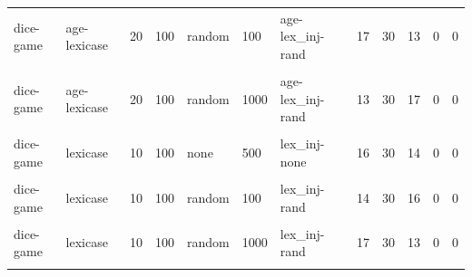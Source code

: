 \documentclass[
]{book}
\begin{document}
\begin{table}
\begin{tabular}{l|l|l|l|l|l|l|r|r|r|r|r}
\hline
\cellcolor{gray!6}{dice-game} & \cellcolor{gray!6}{age-lexicase} & \cellcolor{gray!6}{10} & \cellcolor{gray!6}{100} & \cellcolor{gray!6}{random} & \cellcolor{gray!6}{1000} & \cellcolor{gray!6}{age-lex\_inj-rand} & \cellcolor{gray!6}{15} & \cellcolor{gray!6}{30} & \cellcolor{gray!6}{15} & \cellcolor{gray!6}{9} & \cellcolor{gray!6}{4}\\
\hline
dice-game & age-lexicase & 20 & 100 & random & 100 & age-lex\_inj-rand & 17 & 30 & 13 & 0 & 0\\
\hline
\cellcolor{gray!6}{dice-game} & \cellcolor{gray!6}{age-lexicase} & \cellcolor{gray!6}{20} & \cellcolor{gray!6}{100} & \cellcolor{gray!6}{random} & \cellcolor{gray!6}{500} & \cellcolor{gray!6}{age-lex\_inj-rand} & \cellcolor{gray!6}{13} & \cellcolor{gray!6}{30} & \cellcolor{gray!6}{17} & \cellcolor{gray!6}{1} & \cellcolor{gray!6}{0}\\
\hline
dice-game & age-lexicase & 20 & 100 & random & 1000 & age-lex\_inj-rand & 13 & 30 & 17 & 0 & 0\\
\hline
\cellcolor{gray!6}{dice-game} & \cellcolor{gray!6}{lexicase} & \cellcolor{gray!6}{10} & \cellcolor{gray!6}{100} & \cellcolor{gray!6}{none} & \cellcolor{gray!6}{100} & \cellcolor{gray!6}{lex\_inj-none} & \cellcolor{gray!6}{15} & \cellcolor{gray!6}{30} & \cellcolor{gray!6}{15} & \cellcolor{gray!6}{0} & \cellcolor{gray!6}{0}\\
\hline
dice-game & lexicase & 10 & 100 & none & 500 & lex\_inj-none & 16 & 30 & 14 & 0 & 0\\
\hline
\cellcolor{gray!6}{dice-game} & \cellcolor{gray!6}{lexicase} & \cellcolor{gray!6}{10} & \cellcolor{gray!6}{100} & \cellcolor{gray!6}{none} & \cellcolor{gray!6}{1000} & \cellcolor{gray!6}{lex\_inj-none} & \cellcolor{gray!6}{14} & \cellcolor{gray!6}{30} & \cellcolor{gray!6}{16} & \cellcolor{gray!6}{0} & \cellcolor{gray!6}{0}\\
\hline
dice-game & lexicase & 10 & 100 & random & 100 & lex\_inj-rand & 14 & 30 & 16 & 0 & 0\\
\hline
\cellcolor{gray!6}{dice-game} & \cellcolor{gray!6}{lexicase} & \cellcolor{gray!6}{10} & \cellcolor{gray!6}{100} & \cellcolor{gray!6}{random} & \cellcolor{gray!6}{500} & \cellcolor{gray!6}{lex\_inj-rand} & \cellcolor{gray!6}{14} & \cellcolor{gray!6}{30} & \cellcolor{gray!6}{16} & \cellcolor{gray!6}{0} & \cellcolor{gray!6}{0}\\
\hline
dice-game & lexicase & 10 & 100 & random & 1000 & lex\_inj-rand & 17 & 30 & 13 & 0 & 0\\
\hline
\cellcolor{gray!6}{dice-game} & \cellcolor{gray!6}{lexicase} & \cellcolor{gray!6}{20} & \cellcolor{gray!6}{100} & \cellcolor{gray!6}{none} & \cellcolor{gray!6}{100} & \cellcolor{gray!6}{lex\_inj-none} & \cellcolor{gray!6}{10} & \cellcolor{gray!6}{30} & \cellcolor{gray!6}{20} & \cellcolor{gray!6}{0} & \cellcolor{gray!6}{0}\\

\end{tabular}
\end{table}
\end{document}

